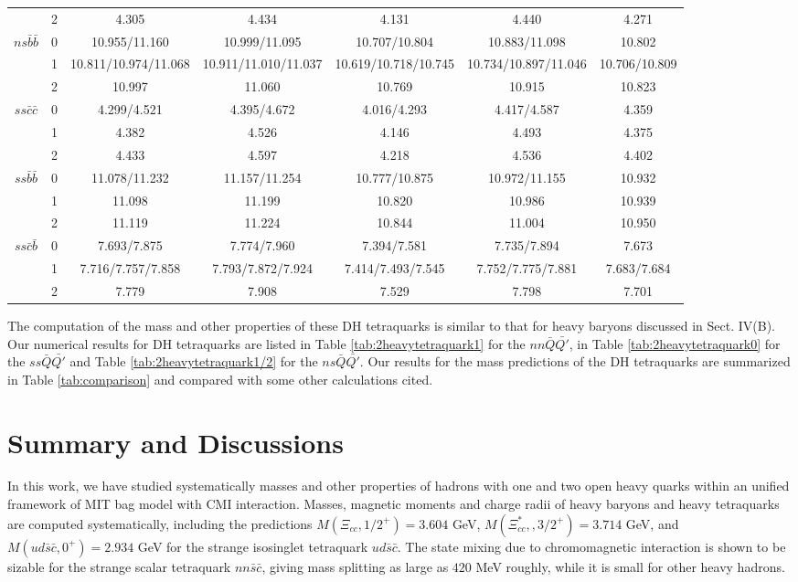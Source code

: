 \documentclass[prd,twocolumn,floatfix,nofootinbib]{revtex4}
\begin{document}
\begin{table}[!htb]
\begin{tabular}{ccccccc}
& 2 & 4.305 & 4.434 & 4.131 & 4.440 & 4.271 \\
$ns\bar{b}\bar{b}$ & 0 & 10.955/11.160 & 10.999/11.095 & 10.707/10.804 &
10.883/11.098 & 10.802 \\
& 1 & 10.811/10.974/11.068 & 10.911/11.010/11.037 & 10.619/10.718/10.745 &
10.734/10.897/11.046 & 10.706/10.809 \\
& 2 & 10.997 & 11.060 & 10.769 & 10.915 & 10.823 \\
$ss\bar{c}\bar{c}$ & 0 & 4.299/4.521 & 4.395/4.672 & 4.016/4.293 &
4.417/4.587 & 4.359 \\
& 1 & 4.382 & 4.526 & 4.146 & 4.493 & 4.375 \\
& 2 & 4.433 & 4.597 & 4.218 & 4.536 & 4.402 \\
$ss\bar{b}\bar{b}$ & 0 & 11.078/11.232 & 11.157/11.254 & 10.777/10.875 &
10.972/11.155 & 10.932 \\
& 1 & 11.098 & 11.199 & 10.820 & 10.986 & 10.939 \\
& 2 & 11.119 & 11.224 & 10.844 & 11.004 & 10.950 \\
$ss\bar{c}\bar{b}$ & 0 & 7.693/7.875 & 7.774/7.960 & 7.394/7.581 &
7.735/7.894 & 7.673 \\
& 1 & 7.716/7.757/7.858 & 7.793/7.872/7.924 & 7.414/7.493/7.545 &
7.752/7.775/7.881 & 7.683/7.684 \\
& 2 & 7.779 & 7.908 & 7.529 & 7.798 & 7.701 \\ \hline\hline
\end{tabular}%
\end{table}

The computation of the mass and other properties of these DH tetraquarks is
similar to that for heavy baryons discussed in Sect. IV(B). Our numerical
results for DH tetraquarks are listed in Table \ref{tab:2heavytetraquark1}
for the $nn\bar{Q}\bar{Q\prime }$, in Table \ref{tab:2heavytetraquark0} for
the $ss\bar{Q}\bar{Q\prime }$ and Table \ref{tab:2heavytetraquark1/2} for
the $ns\bar{Q}\bar{Q\prime }$. Our results for the mass predictions of the
DH tetraquarks are summarized in Table \ref{tab:comparison} and compared
with some other calculations cited.

\section{Summary and Discussions}

\label{Discussions} In this work, we have studied systematically masses and
other properties of hadrons with one and two open heavy quarks within an
unified framework of MIT bag model with CMI interaction. Masses, magnetic
moments and charge radii of heavy baryons and heavy tetraquarks are computed
systematically, including the predictions $M(\Xi _{cc},1/2^{+})=3.604$ GeV, $%
M(\Xi _{cc}^{\ast },,3/2^{+})=3.714$ GeV, and $M\left( ud\bar{s}\bar{c}%
,0^{+}\right) =2.934$ GeV for the strange isosinglet tetraquark $ud\bar{s}%
\bar{c}$. The state mixing due to chromomagnetic interaction is shown to be
sizable for the strange scalar tetraquark $nn\bar{s}\bar{c}$, giving mass
splitting as large as $420$ MeV roughly, while it is small for other heavy
hadrons.
\end{document}
